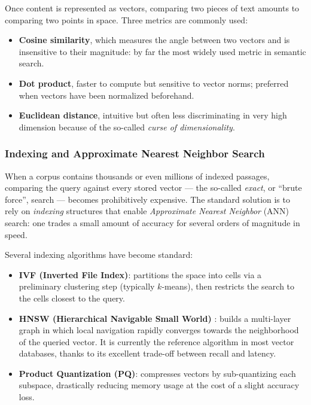 \documentclass[a4paper,11pt]{article}
\begin{document}
Once content is represented as vectors, comparing two pieces of text
amounts to comparing two points in space. Three metrics are commonly used:

\begin{itemize}
  \item \textbf{Cosine similarity}, which measures the angle between two
    vectors and is insensitive to their magnitude: by far the most widely
    used metric in semantic search.
  \item \textbf{Dot product}, faster to compute but sensitive to vector
    norms; preferred when vectors have been normalized beforehand.
  \item \textbf{Euclidean distance}, intuitive but often less discriminating
    in very high dimension because of the so-called \emph{curse of
    dimensionality}.
\end{itemize}

\subsubsection{Indexing and Approximate Nearest Neighbor Search}

When a corpus contains thousands or even millions of indexed passages,
comparing the query against every stored vector --- the so-called
\emph{exact}, or ``brute force'', search --- becomes prohibitively
expensive. The standard solution is to rely on \emph{indexing} structures
that enable \emph{Approximate Nearest Neighbor} (ANN) search: one trades a
small amount of accuracy for several orders of magnitude in speed.

Several indexing algorithms have become standard:

\begin{itemize}
  \item \textbf{IVF (Inverted File Index)}: partitions the space into
    cells via a preliminary clustering step (typically $k$-means), then
    restricts the search to the cells closest to the query.
  \item \textbf{HNSW (Hierarchical Navigable Small World)}
    \cite{malkov2018hnsw}: builds a multi-layer graph in which local
    navigation rapidly converges towards the neighborhood of the queried
    vector. It is currently the reference algorithm in most vector
    databases, thanks to its excellent trade-off between recall and latency.
  \item \textbf{Product Quantization (PQ)}: compresses vectors by
    sub-quantizing each subspace, drastically reducing memory usage at the
    cost of a slight accuracy loss.
\end{itemize}
\end{document}
